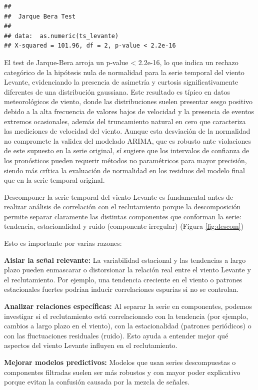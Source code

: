 \documentclass[
]{article}
\begin{document}
\begin{verbatim}
## 
##  Jarque Bera Test
## 
## data:  as.numeric(ts_levante)
## X-squared = 101.96, df = 2, p-value < 2.2e-16
\end{verbatim}

El test de Jarque-Bera arroja un p-value \textless{} 2.2e-16, lo que indica un rechazo categórico de la hipótesis nula de normalidad para la serie temporal del viento Levante, evidenciando la presencia de asimetría y curtosis significativamente diferentes de una distribución gaussiana. Este resultado es típico en datos meteorológicos de viento, donde las distribuciones suelen presentar sesgo positivo debido a la alta frecuencia de valores bajos de velocidad y la presencia de eventos extremos ocasionales, además del truncamiento natural en cero que caracteriza las mediciones de velocidad del viento. Aunque esta desviación de la normalidad no compromete la validez del modelado ARIMA, que es robusto ante violaciones de este supuesto en la serie original, sí sugiere que los intervalos de confianza de los pronósticos pueden requerir métodos no paramétricos para mayor precisión, siendo más crítica la evaluación de normalidad en los residuos del modelo final que en la serie temporal original.

Descomponer la serie temporal del viento Levante es fundamental antes de realizar análisis de correlación con el reclutamiento porque la descomposición permite separar claramente las distintas componentes que conforman la serie: tendencia, estacionalidad y ruido (componente irregular) (Figura \ref{fig:descom})

Esto es importante por varias razones:

\textbf{Aislar la señal relevante:} La variabilidad estacional y las tendencias a largo plazo pueden enmascarar o distorsionar la relación real entre el viento Levante y el reclutamiento. Por ejemplo, una tendencia creciente en el viento o patrones estacionales fuertes podrían inducir correlaciones espurias si no se controlan.

\textbf{Analizar relaciones específicas:} Al separar la serie en componentes, podemos investigar si el reclutamiento está correlacionado con la tendencia (por ejemplo, cambios a largo plazo en el viento), con la estacionalidad (patrones periódicos) o con las fluctuaciones residuales (ruido). Esto ayuda a entender mejor qué aspectos del viento Levante influyen en el reclutamiento.

\textbf{Mejorar modelos predictivos:} Modelos que usan series descompuestas o componentes filtradas suelen ser más robustos y con mayor poder explicativo porque evitan la confusión causada por la mezcla de señales.
\end{document}
